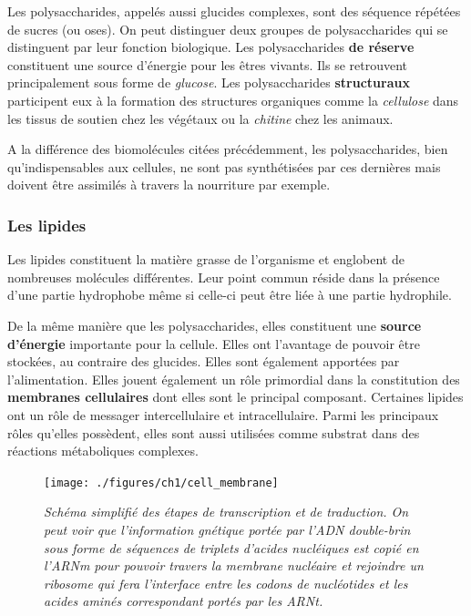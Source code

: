 Les polysaccharides, appelés aussi glucides complexes, sont des séquence répétées de sucres (ou oses). On peut distinguer deux groupes de polysaccharides qui se distinguent par leur fonction biologique. Les polysaccharides \textbf{de réserve} constituent une source d'énergie pour les êtres vivants. Ils se retrouvent principalement sous forme de \textit{glucose}.
Les polysaccharides \textbf{structuraux} participent eux à la formation des structures organiques comme la \textit{cellulose} dans les tissus de soutien chez les végétaux ou la \textit{chitine} chez les animaux.

A la différence des biomolécules citées précédemment, les polysaccharides, bien qu'indispensables aux cellules, ne sont pas synthétisées par ces dernières mais doivent être assimilés à travers la nourriture par exemple.

\subsubsection{Les lipides}

Les lipides constituent la matière grasse de l'organisme et englobent de nombreuses molécules différentes. Leur point commun réside dans la présence d'une partie hydrophobe même si celle-ci peut être liée à une partie hydrophile.

De la même manière que les polysaccharides, elles constituent une \textbf{source d'énergie} importante pour la cellule. Elles ont l'avantage de pouvoir être stockées, au contraire des glucides. Elles sont également apportées par l'alimentation.
Elles jouent également un rôle primordial dans la constitution des \textbf{membranes cellulaires} dont elles sont le principal composant.
Certaines lipides ont un rôle de messager intercellulaire et intracellulaire.
Parmi les principaux rôles qu'elles possèdent, elles sont aussi utilisées comme substrat dans des réactions métaboliques complexes.

\begin{figure}
  \centering
  {\texttt{[image: ./figures/ch1/cell\_membrane]}}
    \caption{\it Schéma simplifié des étapes de transcription et de traduction. On peut voir que l'information gnétique portée par l'ADN double-brin sous forme de séquences de triplets d'acides nucléiques est copié en l'ARNm pour pouvoir travers la membrane nucléaire et rejoindre un ribosome qui fera l'interface entre les codons de nucléotides et les acides aminés correspondant portés par les ARNt.}
    \label{Fig:transc_trad_HD}
  \hspace{0.3cm}
\end{figure}


